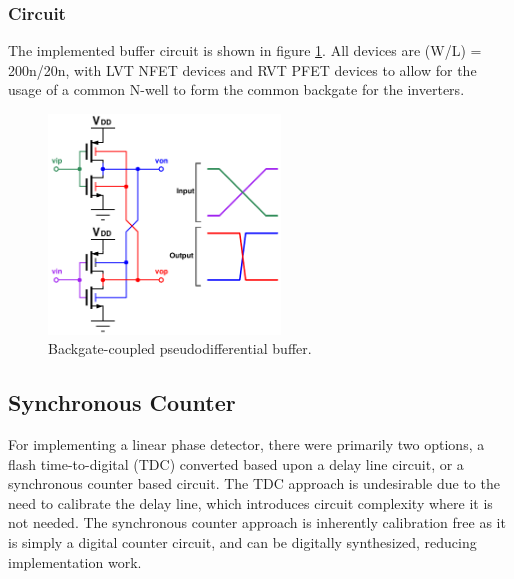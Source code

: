 		\subsubsection{Circuit}
		The implemented buffer circuit is shown in figure \ref{fig:pd_buffer_circuit}. All devices are (W/L) = 200n/20n, with LVT NFET devices and RVT PFET devices to allow for the usage of a common N-well to form the common backgate for the inverters.
			\begin{figure}[htb!]
			        \centering
			        \includegraphics[width=0.55\textwidth, angle=0]{./figs/design/pseudiff_buffer}
			    \caption{Backgate-coupled pseudodifferential buffer.}
			    \label{fig:pd_buffer_circuit}
			\end{figure}



	\FloatBarrier
	\subsection{Synchronous Counter}
	For implementing a linear phase detector, there were primarily two options, a flash time-to-digital (TDC) converted based upon a delay line circuit, or a synchronous counter based circuit. The TDC approach is undesirable due to the need to calibrate the delay line, which introduces circuit complexity where it is not needed. The synchronous counter approach is inherently calibration free as it is simply a digital counter circuit, and can be digitally synthesized, reducing implementation work. 
	
